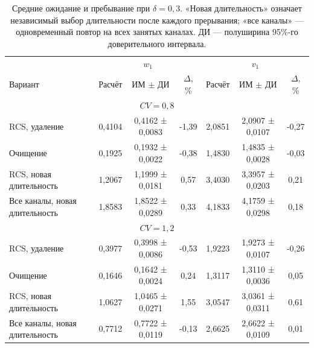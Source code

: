 \begin{table}[!htbp]
\centering\small\setlength{\tabcolsep}{3pt}
\begin{tabular}{@{}p{4.2cm}cccccc@{}}
\toprule
 & \multicolumn{3}{c}{$w_1$} & \multicolumn{3}{c}{$v_1$} \\
Вариант & Расчёт & ИМ $\pm$ ДИ & $\Delta$, \% & Расчёт & ИМ $\pm$ ДИ & $\Delta$, \% \\
\midrule
\multicolumn{7}{c}{$CV=0,8$} \\
RCS, удаление & 0,4104 & 0,4162 ± 0,0083 & -1,39 & 2,0851 & 2,0907 ± 0,0107 & -0,27 \\
Очищение & 0,1925 & 0,1932 ± 0,0022 & -0,38 & 1,4830 & 1,4835 ± 0,0028 & -0,03 \\
RCS, новая длительность & 1,2067 & 1,1999 ± 0,0181 & 0,57 & 3,4030 & 3,3957 ± 0,0203 & 0,21 \\
Все каналы, новая длительность & 1,8583 & 1,8522 ± 0,0289 & 0,33 & 4,1833 & 4,1759 ± 0,0298 & 0,18 \\
\multicolumn{7}{c}{$CV=1,2$} \\
RCS, удаление & 0,3977 & 0,3998 ± 0,0086 & -0,53 & 1,9223 & 1,9273 ± 0,0107 & -0,26 \\
Очищение & 0,1646 & 0,1642 ± 0,0024 & 0,24 & 1,3117 & 1,3110 ± 0,0036 & 0,05 \\
RCS, новая длительность & 1,0627 & 1,0465 ± 0,0271 & 1,55 & 3,0547 & 3,0361 ± 0,0311 & 0,61 \\
Все каналы, новая длительность & 0,7712 & 0,7722 ± 0,0119 & -0,13 & 2,6625 & 2,6622 ± 0,0109 & 0,01 \\
\bottomrule
\end{tabular}
\caption{Средние ожидание и пребывание при $\delta=0{,}3$. «Новая длительность» означает независимый выбор длительности после каждого прерывания; «все каналы» --- одновременный повтор на всех занятых каналах. ДИ --- полуширина 95\%-го доверительного интервала.}
\label{tab:results}
\end{table}

